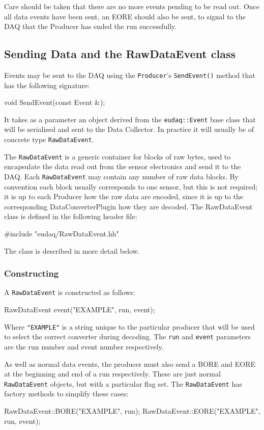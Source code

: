 Care should be taken that there are no more events pending to be read out.
Once all data events have been sent, an \gls{EORE} should also be sent,
to signal to the DAQ that the Producer has ended the run successfully.

\subsection{Sending Data and the RawDataEvent class}
Events may be sent to the DAQ using the \texttt{Producer}'s \texttt{SendEvent()} method
that has the following signature:
\begin{listing}
void SendEvent(const Event &);
\end{listing}

It takes as a parameter an object derived from the \texttt{eudaq::Event} base class
that will be serialised and sent to the Data Collector.
In practice it will usually be of concrete type \texttt{RawDataEvent}.

The \texttt{RawDataEvent} is a generic container for blocks of raw bytes,
used to encapsulate the data read out from the sensor electronics
and send it to the DAQ.
Each \texttt{RawDataEvent} may contain any number of raw data blocks.
By convention each block usually corresponds to one sensor,
but this is not required;
it is up to each Producer how the raw data are encoded,
since it is up to the corresponding DataConverterPlugin how they are decoded.
The RawDataEvent class is defined in the following header file:
\begin{listing}
#include "eudaq/RawDataEvent.hh"
\end{listing}

The class is described in more detail below.

\subsubsection{Constructing}
A \texttt{RawDataEvent} is constructed as follows:
\begin{listing}
RawDataEvent event("EXAMPLE", run, event);
\end{listing}

Where \texttt{"EXAMPLE"} is a string unique to the particular producer
that will be used to select the correct converter during decoding.
The \texttt{run} and \texttt{event} parameters are the run number
and event number respectively.

As well as normal data events, the producer must also send a \gls{BORE}
and \gls{EORE} at the beginning and end of a run respectively.
These are just normal \texttt{RawDataEvent} objects, but with a particular flag set.
The \texttt{RawDataEvent} has factory methods to simplify these cases:
\begin{listing}
RawDataEvent::BORE("EXAMPLE", run);
RawDataEvent::EORE("EXAMPLE", run, event);
\end{listing}

